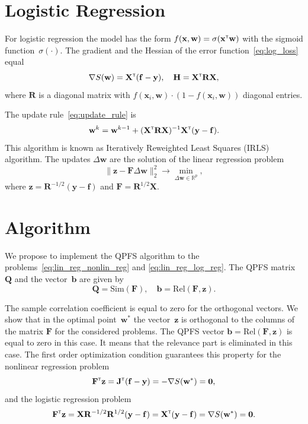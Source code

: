 \documentclass[
11pt,%
tightenlines,%
twoside,%
onecolumn,%
nofloats,%
nobibnotes,%
nofootinbib,%
superscriptaddress,%
noshowpacs,%
centertags]%
{revtex4}
\newcommand{\bb}{\mathbf{b}}
\newcommand{\bw}{\mathbf{w}}
\newcommand{\by}{\mathbf{y}}
\newcommand{\bx}{\mathbf{x}}
\newcommand{\bz}{\mathbf{z}}
\newcommand{\bJ}{\mathbf{J}}
\newcommand{\bQ}{\mathbf{Q}}
\newcommand{\bbR}{\mathbb{R}}
\newcommand{\bH}{\mathbf{H}}
\newcommand{\bF}{\mathbf{F}}
\newcommand{\bR}{\mathbf{R}}
\newcommand{\bX}{\mathbf{X}}
\newcommand{\T}{{\text{\tiny\sffamily\upshape\mdseries T}}}
\begin{document}
\section{Logistic Regression}
	For logistic regression the model has the form $f(\bx , \bw) = \sigma(\bx^{\T} \bw)$ with the sigmoid function~$\sigma(\cdot)$.
The gradient and the Hessian of the error function~\eqref{eq:log_loss} equal
\begin{equation}
\nabla S(\bw) = \bX^{\T} (\mathbf{f} - \by), \quad \bH = \bX^{\T} \bR \bX,
\label{eq:log_reg_deriv}
\end{equation}
where $\bR$ is a diagonal matrix with $f(\bx_i , \bw) \cdot (1 - f(\bx_i , \bw))$ diagonal entries.

The update rule~\eqref{eq:update_rule} is
\[
\bw^k = \bw^{k - 1} + (\bX^{\T} \bR \bX)^{-1} \bX^{\T} (\by - \mathbf{f}).
\]
This algorithm is known as Iteratively Reweighted Least Squares (IRLS) algorithm. The updates $\Delta \bw$ are the solution of the linear regression problem
\begin{equation}
\| \bz - \bF \Delta \bw \|_2^2 \rightarrow \min_{\Delta \bw \in \bbR^{p}},
\label{eq:lin_reg_log_reg}
\end{equation}
where $\bz = \bR^{-1/2} (\by - \mathbf{f})$ and $\bF = \bR^{1/2}\bX$.

\section{Algorithm}

We propose to implement the QPFS algorithm to the problems~\eqref{eq:lin_reg_nonlin_reg} and \eqref{eq:lin_reg_log_reg}. 
The QPFS matrix~$\bQ$ and the vector~$\bb$ are given by
\[
\bQ = \text{Sim} (\bF), \quad \bb = \text{Rel} (\bF, \bz).
\]

The sample correlation coefficient is equal to zero for the orthogonal vectors.
We show that in the optimal point~$\bw^*$ the vector~$\bz$ is orthogonal to the columns of the matrix $\bF$ for the considered problems. 
The QPFS vector $\bb = \text{Rel} (\bF, \bz)$ is equal to zero in this case. It means that the relevance part is eliminated in this case.
The first order optimization condition guarantees this property for the nonlinear regression problem
\[
\bF^{\T} \bz = \bJ^{\T} (\mathbf{f} - \by) = - \nabla S(\bw^*) = \boldsymbol{0},
\]
and the logistic regression problem
\[
\bF^{\T} \bz = \bX \bR^{-1/2} \bR^{1/2} (\by - \mathbf{f}) = \bX^{\T} (\by - \mathbf{f}) = \nabla S(\bw^*) = \boldsymbol{0}.
\]
\end{document}
